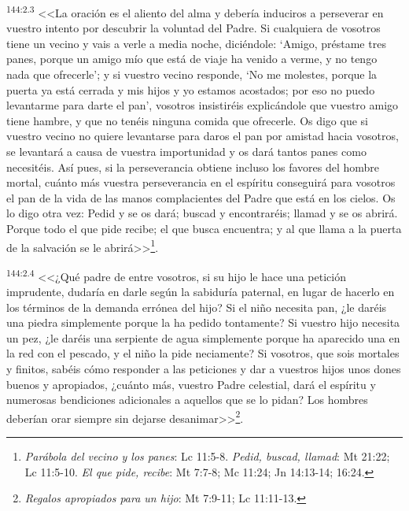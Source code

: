 \par 
\textsuperscript{144:2.3} <<La oración es el aliento del alma y debería induciros a perseverar en vuestro intento por descubrir la voluntad del Padre. Si cualquiera de vosotros tiene un vecino y vais a verle a media noche, diciéndole: `Amigo, préstame tres panes, porque un amigo mío que está de viaje ha venido a verme, y no tengo nada que ofrecerle'; y si vuestro vecino responde, `No me molestes, porque la puerta ya está cerrada y mis hijos y yo estamos acostados; por eso no puedo levantarme para darte el pan', vosotros insistiréis explicándole que vuestro amigo tiene hambre, y que no tenéis ninguna comida que ofrecerle. Os digo que si vuestro vecino no quiere levantarse para daros el pan por amistad hacia vosotros, se levantará a causa de vuestra importunidad y os dará tantos panes como necesitéis. Así pues, si la perseverancia obtiene incluso los favores del hombre mortal, cuánto más vuestra perseverancia en el espíritu conseguirá para vosotros el pan de la vida de las manos complacientes del Padre que está en los cielos. Os lo digo otra vez: Pedid y se os dará; buscad y encontraréis; llamad y se os abrirá. Porque todo el que pide recibe; el que busca encuentra; y al que llama a la puerta de la salvación se le abrirá>>\footnote{\textit{Parábola del vecino y los panes}: Lc 11:5-8. \textit{Pedid, buscad, llamad}: Mt 21:22; Lc 11:5-10. \textit{El que pide, recibe}: Mt 7:7-8; Mc 11:24; Jn 14:13-14; 16:24.}.

\par 
\textsuperscript{144:2.4} <<¿Qué padre de entre vosotros, si su hijo le hace una petición imprudente, dudaría en darle según la sabiduría paternal, en lugar de hacerlo en los términos de la demanda errónea del hijo? Si el niño necesita pan, ¿le daréis una piedra simplemente porque la ha pedido tontamente? Si vuestro hijo necesita un pez, ¿le daréis una serpiente de agua simplemente porque ha aparecido una en la red con el pescado, y el niño la pide neciamente? Si vosotros, que sois mortales y finitos, sabéis cómo responder a las peticiones y dar a vuestros hijos unos dones buenos y apropiados, ¿cuánto más, vuestro Padre celestial, dará el espíritu y numerosas bendiciones adicionales a aquellos que se lo pidan? Los hombres deberían orar siempre sin dejarse desanimar>>\footnote{\textit{Regalos apropiados para un hijo}: Mt 7:9-11; Lc 11:11-13.}.

